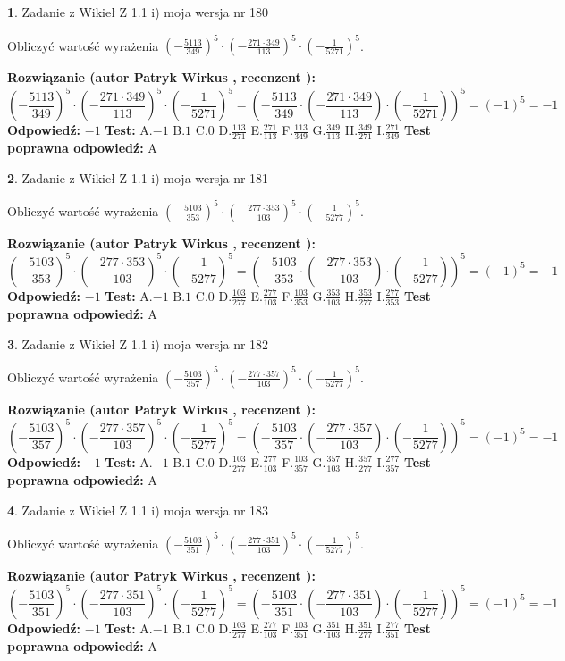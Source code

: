 \documentclass[12pt, a4paper]{article}
\theoremstyle{definition} %
\newtheorem{zad}{}
\newcommand{\zadStart}[1]{\begin{zad}#1\newline}
\newcommand{\zadStop}{\end{zad}}
\newcommand{\rozwStart}[2]{\noindent \textbf{Rozwiązanie (autor #1 , recenzent #2): }\newline}
\newcommand{\rozwStop}{\newline}
\newcommand{\odpStart}{\noindent \textbf{Odpowiedź:}\newline}
\newcommand{\odpStop}{\newline}
\newcommand{\testStart}{\noindent \textbf{Test:}\newline}
\newcommand{\testStop}{\newline}
\newcommand{\kluczStart}{\noindent \textbf{Test poprawna odpowiedź:}\newline}
\newcommand{\kluczStop}{\newline}
\begin{document}
\zadStart{Zadanie z Wikieł Z 1.1 i) moja wersja nr 180}

Obliczyć wartość wyrażenia $(-\frac{5113}{349})^{5} \cdot (-\frac{271 \cdot 349}{113})^{5} \cdot (-\frac{1}{5271})^{5}$.
\zadStop
\rozwStart{Patryk Wirkus}{}
$$(-\frac{5113}{349})^{5} \cdot (-\frac{271 \cdot 349}{113})^{5} \cdot (-\frac{1}{5271})^{5} = (-\frac{5113}{349} \cdot (-\frac{271 \cdot 349}{113}) \cdot (-\frac{1}{5271}))^{5} = (-1)^{5} = -1$$
\rozwStop
\odpStart
$-1$
\odpStop
\testStart
A.$-1$ B.$1$ C.$0$ D.$\frac{113}{271}$ E.$\frac{271}{113}$
F.$\frac{113}{349}$ G.$\frac{349}{113}$
H.$\frac{349}{271}$
I.$\frac{271}{349}$
\testStop
\kluczStart
A
\kluczStop



\zadStart{Zadanie z Wikieł Z 1.1 i) moja wersja nr 181}

Obliczyć wartość wyrażenia $(-\frac{5103}{353})^{5} \cdot (-\frac{277 \cdot 353}{103})^{5} \cdot (-\frac{1}{5277})^{5}$.
\zadStop
\rozwStart{Patryk Wirkus}{}
$$(-\frac{5103}{353})^{5} \cdot (-\frac{277 \cdot 353}{103})^{5} \cdot (-\frac{1}{5277})^{5} = (-\frac{5103}{353} \cdot (-\frac{277 \cdot 353}{103}) \cdot (-\frac{1}{5277}))^{5} = (-1)^{5} = -1$$
\rozwStop
\odpStart
$-1$
\odpStop
\testStart
A.$-1$ B.$1$ C.$0$ D.$\frac{103}{277}$ E.$\frac{277}{103}$
F.$\frac{103}{353}$ G.$\frac{353}{103}$
H.$\frac{353}{277}$
I.$\frac{277}{353}$
\testStop
\kluczStart
A
\kluczStop



\zadStart{Zadanie z Wikieł Z 1.1 i) moja wersja nr 182}

Obliczyć wartość wyrażenia $(-\frac{5103}{357})^{5} \cdot (-\frac{277 \cdot 357}{103})^{5} \cdot (-\frac{1}{5277})^{5}$.
\zadStop
\rozwStart{Patryk Wirkus}{}
$$(-\frac{5103}{357})^{5} \cdot (-\frac{277 \cdot 357}{103})^{5} \cdot (-\frac{1}{5277})^{5} = (-\frac{5103}{357} \cdot (-\frac{277 \cdot 357}{103}) \cdot (-\frac{1}{5277}))^{5} = (-1)^{5} = -1$$
\rozwStop
\odpStart
$-1$
\odpStop
\testStart
A.$-1$ B.$1$ C.$0$ D.$\frac{103}{277}$ E.$\frac{277}{103}$
F.$\frac{103}{357}$ G.$\frac{357}{103}$
H.$\frac{357}{277}$
I.$\frac{277}{357}$
\testStop
\kluczStart
A
\kluczStop



\zadStart{Zadanie z Wikieł Z 1.1 i) moja wersja nr 183}

Obliczyć wartość wyrażenia $(-\frac{5103}{351})^{5} \cdot (-\frac{277 \cdot 351}{103})^{5} \cdot (-\frac{1}{5277})^{5}$.
\zadStop
\rozwStart{Patryk Wirkus}{}
$$(-\frac{5103}{351})^{5} \cdot (-\frac{277 \cdot 351}{103})^{5} \cdot (-\frac{1}{5277})^{5} = (-\frac{5103}{351} \cdot (-\frac{277 \cdot 351}{103}) \cdot (-\frac{1}{5277}))^{5} = (-1)^{5} = -1$$
\rozwStop
\odpStart
$-1$
\odpStop
\testStart
A.$-1$ B.$1$ C.$0$ D.$\frac{103}{277}$ E.$\frac{277}{103}$
F.$\frac{103}{351}$ G.$\frac{351}{103}$
H.$\frac{351}{277}$
I.$\frac{277}{351}$
\testStop
\kluczStart
A
\kluczStop
\end{document}
